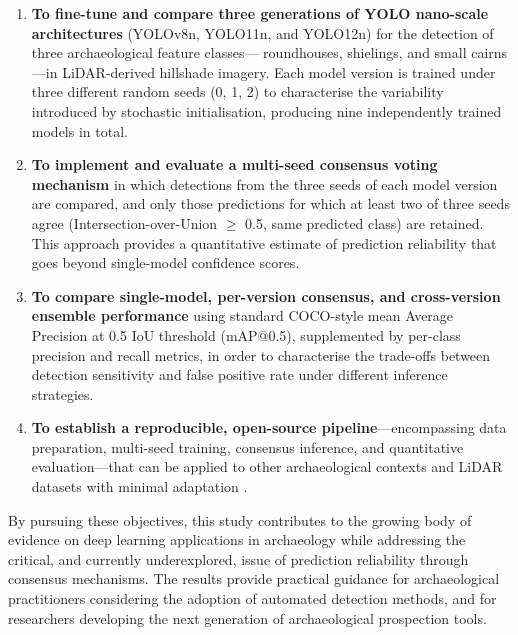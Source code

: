 \documentclass[12pt,a4paper]{article}
\begin{document}
\begin{enumerate}[leftmargin=*]

\item \textbf{To fine-tune and compare three generations of YOLO nano-scale architectures}
(YOLOv8n, YOLO11n, and YOLO12n) for the detection of three archaeological feature classes---
roundhouses, shielings, and small cairns---in LiDAR-derived hillshade imagery. Each model
version is trained under three different random seeds (0, 1, 2) to characterise the
variability introduced by stochastic initialisation, producing nine independently trained
models in total.

\item \textbf{To implement and evaluate a multi-seed consensus voting mechanism} in which
detections from the three seeds of each model version are compared, and only those
predictions for which at least two of three seeds agree (Intersection-over-Union $\geq$ 0.5,
same predicted class) are retained. This approach provides a quantitative estimate of
prediction reliability that goes beyond single-model confidence scores.

\item \textbf{To compare single-model, per-version consensus, and cross-version ensemble
performance} using standard COCO-style mean Average Precision at 0.5 IoU threshold
(mAP@0.5), supplemented by per-class precision and recall metrics, in order to characterise
the trade-offs between detection sensitivity and false positive rate under different
inference strategies.

\item \textbf{To establish a reproducible, open-source pipeline}---encompassing data
preparation, multi-seed training, consensus inference, and quantitative evaluation---that
can be applied to other archaeological contexts and LiDAR datasets with minimal adaptation
\citep{yingqingyang2026arran}.

\end{enumerate}

By pursuing these objectives, this study contributes to the growing body of evidence on
deep learning applications in archaeology while addressing the critical, and currently
underexplored, issue of prediction reliability through consensus mechanisms. The results
provide practical guidance for archaeological practitioners considering the adoption of
automated detection methods, and for researchers developing the next generation of
archaeological prospection tools.
\end{document}
